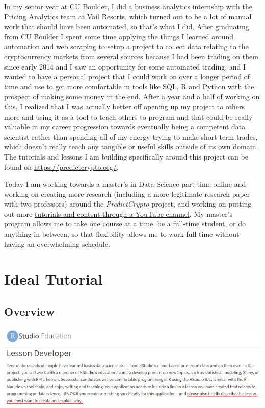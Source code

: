 \documentclass[
]{book}
\begin{document}
In my senior year at CU Boulder, I did a business analytics internship with the Pricing Analytics team at Vail Resorts, which turned out to be a lot of manual work that should have been automated, so that's what I did. After graduating from CU Boulder I spent some time applying the things I learned around automation and web scraping to setup a project to collect data relating to the cryptocurrency markets from several sources because I had been trading on them since early 2014 and I saw an opportunity for some automated trading, and I wanted to have a personal project that I could work on over a longer period of time and use to get more comfortable in tools like SQL, R and Python with the prospect of making some money in the end. After a year and a half of working on this, I realized that I was actually better off opening up my project to others more and using it as a tool to teach others to program and that could be really valuable in my career progression towards eventually being a competent data scientist rather than spending all of my energy trying to make short-term trades, which doesn't really teach any tangible or useful skills outside of its own domain. The tutorials and lessons I am building specifically around this project can be found on \url{https://predictcrypto.org/}.

Today I am working towards a master's in Data Science part-time online and working on creating more research (including a more legitimate research paper with two professors) around the \emph{PredictCrypto} project, and working on putting out more \href{https://www.youtube.com/channel/UCZKbm8LERZBe_hwJNwroCPg?view_as=subscriber}{tutorials and content through a YouTube channel}. My master's program allows me to take one course at a time, be a full-time student, or do anything in between, so that flexibility allows me to work full-time without having an overwhelming schedule.

\hypertarget{ideal-tutorial}{%
\chapter{Ideal Tutorial}\label{ideal-tutorial}}

\hypertarget{overview-1}{%
\section{Overview}\label{overview-1}}

\includegraphics{images/idealTutorial.png}
\end{document}
